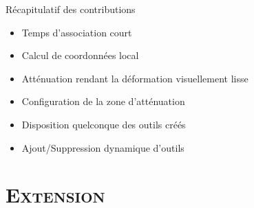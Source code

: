 \documentclass[xcolor=x11names,compress]{beamer}
\renewcommand{\(}{\begin{columns}} \renewcommand{\)}{\end{columns}}
\newcommand{\<}[1]{\begin{column}{#1}} \renewcommand{\>}{\end{column}}
\begin{document}
\begin{frame}{Récapitulatif des contributions}
  \begin{itemize}
    \item Temps d'association court
    \item Calcul de coordonnées local
    \item Atténuation rendant la déformation visuellement lisse
    \item Configuration de la zone d'atténuation
    \item Disposition quelconque des outils créés
    \item Ajout/Suppression dynamique d'outils
  \end{itemize}
\end{frame}

\section{\scshape Extension}
\end{document}
